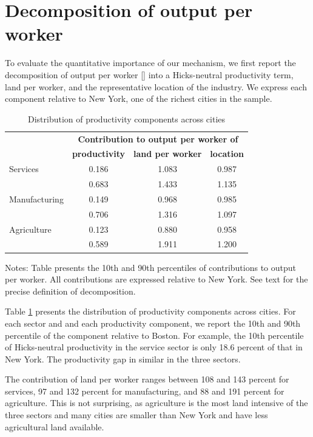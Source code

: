 \documentclass[12pt]{article}
\begin{document}
\section{Decomposition of output per worker}
To evaluate the quantitative importance of our mechanism, we first report the decomposition of output per worker \eqref{} into a Hicks-neutral productivity term, land per worker, and the representative location of the industry. We express each component relative to New York, one of the richest cities in the sample.

\begin{table}[h!]
  \begin{center}
  \caption{Distribution of productivity components across cities\label{tab:decomposition}}
    \begin{tabular}{lccc}
    \toprule
    \textbf{} & \multicolumn{3}{c}{\textbf{Contribution to output per worker of}}\\
    \textbf{} & \textbf{productivity} & \textbf{land per worker} & \textbf{location} \\
    \midrule
Services	& 0.186	& 1.083	& 0.987	\\
	& 0.683	& 1.433	& 1.135	\\
				
Manufacturing	& 0.149	& 0.968	& 0.985	\\
	& 0.706	& 1.316	& 1.097	\\
				
Agriculture	& 0.123	& 0.880	& 0.958	\\
	& 0.589	& 1.911	& 1.200	\\
    \bottomrule
    \end{tabular}%

  \end{center}
  \noindent \footnotesize{Notes: Table presents the 10th and 90th percentiles of contributions to output per worker. All contributions are expressed relative to New York. See text for the precise definition of decomposition.}
\end{table}

Table \ref{tab:decomposition} presents the distribution of productivity components across cities. For each sector and and each productivity component, we report the 10th and 90th percentile of the component relative to Boston. For example, the 10th percentile of Hicks-neutral productivity in the service sector is only 18.6 percent of that in New York. The productivity gap in similar in the three sectors.

The contribution of land per worker ranges between 108 and 143 percent for services, 97 and 132 percent for manufacturing, and 88 and 191 percent for agriculture. This is not surprising, as agriculture is the most land intensive of the three sectors and many cities are smaller than New York and have less agricultural land available.
\end{document}
